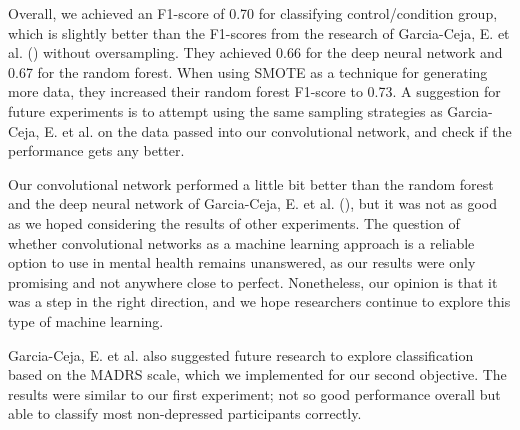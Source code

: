 Overall, we achieved an F1-score of 0.70 for classifying control/condition group, which is slightly better than the F1-scores from the research of Garcia-Ceja, E. et al. (\cite{GarciaCeja2018_classification_bipolar}) without oversampling. They achieved 0.66 for the deep neural network and 0.67 for the random forest. When using SMOTE as a technique for generating more data, they increased their random forest F1-score to 0.73. A suggestion for future experiments is to attempt using the same sampling strategies as Garcia-Ceja, E. et al. on the data passed into our convolutional network, and check if the performance gets any better. 

Our convolutional network performed a little bit better than the random forest and the deep neural network of Garcia-Ceja, E. et al. (\cite{GarciaCeja2018_classification_bipolar}), but it was not as good as we hoped considering the results of other experiments. The question of whether convolutional networks as a machine learning approach is a reliable option to use in mental health remains unanswered, as our results were only promising and not anywhere close to perfect. Nonetheless, our opinion is that it was a step in the right direction, and we hope researchers continue to explore this type of machine learning.

Garcia-Ceja, E. et al. also suggested future research to explore classification based on the MADRS scale, which we implemented for our second objective. The results were similar to our first experiment; not so good performance overall but able to classify most non-depressed participants correctly. 

